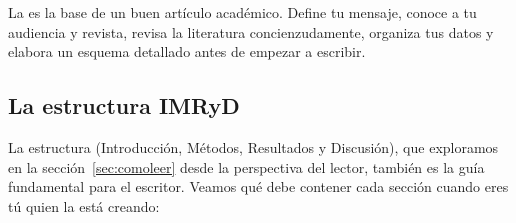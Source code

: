 \begin{remember}
	\label{rem:planificacionarticulo}
	La  es la base de un buen artículo académico.
	Define tu mensaje, conoce a tu audiencia y revista, revisa la literatura
	concienzudamente, organiza tus datos y elabora un esquema detallado antes
	de empezar a escribir.
\end{remember}

\subsection*{La estructura IMRyD}
\label{sub:imrydescritor}

La estructura  (Introducción, Métodos, Resultados y Discusión), que exploramos en la sección~\ref{sec:comoleer} desde la perspectiva del lector, también es la guía fundamental para el escritor.
Veamos qué debe contener cada sección cuando eres tú quien la está creando:

